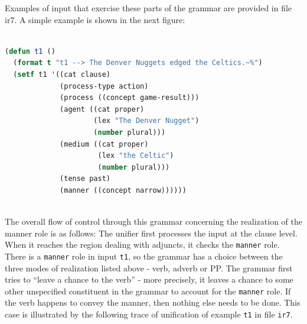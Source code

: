 \documentclass[10pt,a4paper]{report}
\begin{document}
Examples of input that exercise these parts of the grammar are provided in
file ir7.   A simple example is shown in the next figure:

\begin{lstlisting}[language=Lisp]

(defun t1 ()
  (format t "t1 --> The Denver Nuggets edged the Celtics.~%")
  (setf t1 '((cat clause)
			 (process-type action)
			 (process ((concept game-result)))
			 (agent ((cat proper)
					 (lex "The Denver Nugget")
					 (number plural)))
			 (medium ((cat proper)
					  (lex "the Celtic")
					  (number plural)))
			 (tense past)
			 (manner ((concept narrow))))))
		     
\end{lstlisting}

The overall flow of control through this grammar concerning the realization
of the manner role is as follows: 
The unifier first processes the input at the clause level.  When it reaches
the region dealing with adjuncts, it checks the {\tt manner} role.  There is
a {\tt manner} role in input {\tt t1}, so the grammar has a choice between the
three modes of realization listed above - verb, adverb or PP.  The grammar
first tries to ``leave a chance to the verb'' - more precisely, it leaves a
chance to some other unspecified constituent in the grammar to account for
the {\tt manner} role.  If the verb happens to convey the manner, then
nothing else needs to be done.  This case is illustrated by the following
trace of unification of example {\tt t1} in file {\tt ir7}.
\end{document}
